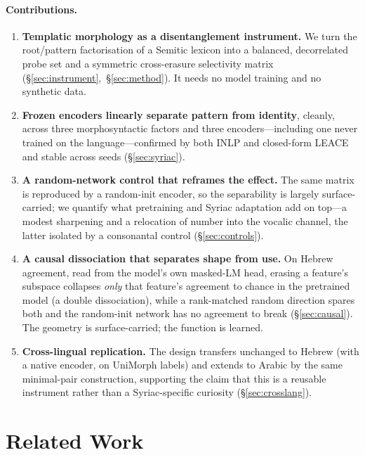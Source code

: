 \documentclass[11pt]{article}
\begin{document}
\paragraph{Contributions.}
\begin{enumerate}
  \item \textbf{Templatic morphology as a disentanglement instrument.} We turn the
  root/pattern factorisation of a Semitic lexicon into a balanced, decorrelated
  probe set and a symmetric cross-erasure selectivity matrix
  (\S\ref{sec:instrument},~\S\ref{sec:method}). It needs no model training and no
  synthetic data.
  \item \textbf{Frozen encoders linearly separate pattern from identity}, cleanly,
  across three morphosyntactic factors and three encoders---including one never
  trained on the language---confirmed by both INLP and closed-form LEACE and stable
  across seeds (\S\ref{sec:syriac}).
  \item \textbf{A random-network control that reframes the effect.} The same matrix
  is reproduced by a random-init encoder, so the separability is largely
  surface-carried; we quantify what pretraining and Syriac adaptation add on top---a
  modest sharpening and a relocation of number into the vocalic channel, the latter
  isolated by a consonantal control (\S\ref{sec:controls}).
  \item \textbf{A causal dissociation that separates shape from use.} On Hebrew
  agreement, read from the model's own masked-LM head, erasing a feature's subspace
  collapses \emph{only} that feature's agreement to chance in the pretrained model
  (a double dissociation), while a rank-matched random direction spares both and the
  random-init network has no agreement to break (\S\ref{sec:causal}). The geometry is
  surface-carried; the function is learned.
  \item \textbf{Cross-lingual replication.} The design transfers unchanged to
  Hebrew (with a native encoder, on UniMorph labels) and extends to Arabic by the
  same minimal-pair construction, supporting the claim that this is a reusable
  instrument rather than a Syriac-specific curiosity (\S\ref{sec:crosslang}).
\end{enumerate}

\section{Related Work}
\label{sec:related}
\end{document}

